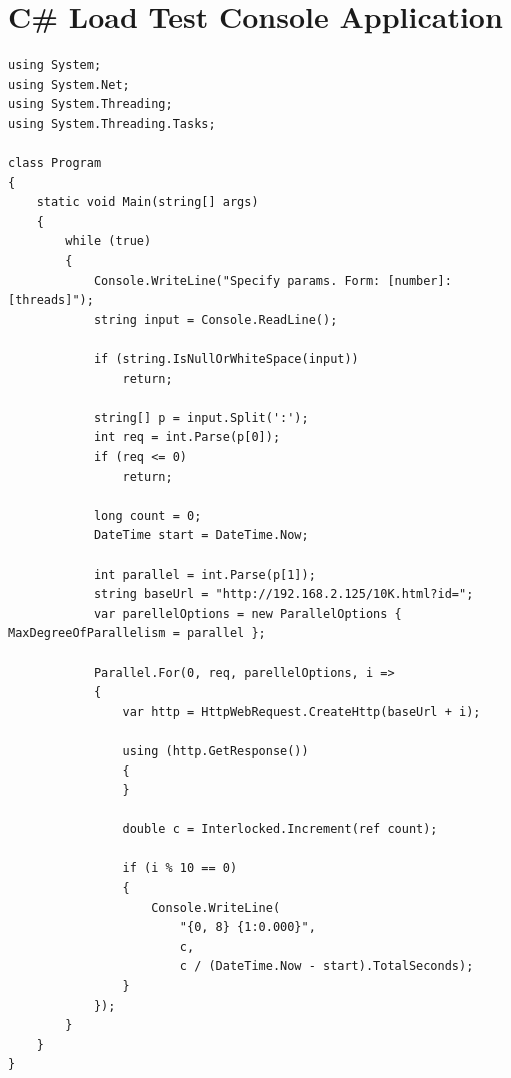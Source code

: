 \section{C\# Load Test Console Application}
\label{appendix:csharp-load}

\begin{verbatim}
using System;
using System.Net;
using System.Threading;
using System.Threading.Tasks;

class Program
{
    static void Main(string[] args)
    {
        while (true)
        {
            Console.WriteLine("Specify params. Form: [number]:[threads]");
            string input = Console.ReadLine();

            if (string.IsNullOrWhiteSpace(input))
                return;

            string[] p = input.Split(':');
            int req = int.Parse(p[0]);
            if (req <= 0)
                return;

            long count = 0;
            DateTime start = DateTime.Now;

            int parallel = int.Parse(p[1]);
            string baseUrl = "http://192.168.2.125/10K.html?id=";
            var parellelOptions = new ParallelOptions { MaxDegreeOfParallelism = parallel };

            Parallel.For(0, req, parellelOptions, i =>
            {
                var http = HttpWebRequest.CreateHttp(baseUrl + i);
                    
                using (http.GetResponse())
                {
                }

                double c = Interlocked.Increment(ref count);

                if (i % 10 == 0)
                {
                    Console.WriteLine(
                        "{0, 8} {1:0.000}", 
                        c, 
                        c / (DateTime.Now - start).TotalSeconds);
                }
            });
        }
    }
}
\end{verbatim}